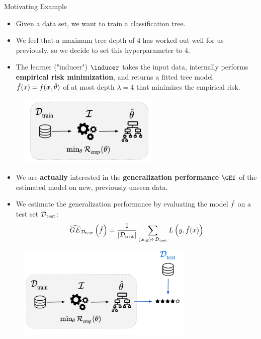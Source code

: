 \begin{vbframe}{Motivating Example} 

\begin{itemize}
\item Given a data set, we want to train a classification tree. 
\item We feel that a maximum tree depth of $4$ has worked out well for us previously, so we decide to set this hyperparameter to $4$. 
\item The learner ("inducer") $\inducer$ takes the input data, internally performs \textbf{empirical risk minimization}, and returns a fitted tree model $\hat{f}(x) = f(\bm{x}, \hat{\theta})$ of at most depth $\lambda = 4$ that minimizes the empirical risk.
\end{itemize}

\begin{center}
\begin{figure}
\includegraphics[width=0.6\textwidth]{figure_man/riskmin_bilevel1.png}
\end{figure}
\end{center}

\framebreak 

\begin{itemize}
\item We are \textbf{actually} interested in the \textbf{generalization performance} $\GEf$ of the estimated model on new, previously unseen data. 
\item We estimate the generalization performance by evaluating the model $\hat{f}$ on a test set $\mathcal{D}_{\text{test}}$: $$
\widehat{GE}_{\mathcal{D}_{\text{test}}}\left(\hat{f}\right) = \frac{1}{|\mathcal{D}_{\text{test}}|} \sum\limits_{(\bm{x}, y) \in \mathcal{D}_{\text{test}}} L\left(y, \hat{f}(x) \right)
$$
\end{itemize}
\vspace*{-0.6cm}
\begin{center}
\begin{figure}
\includegraphics[width=0.75\textwidth]{figure_man/riskmin_bilevel2.png}
\end{figure}
\end{center}


\end{vbframe}
